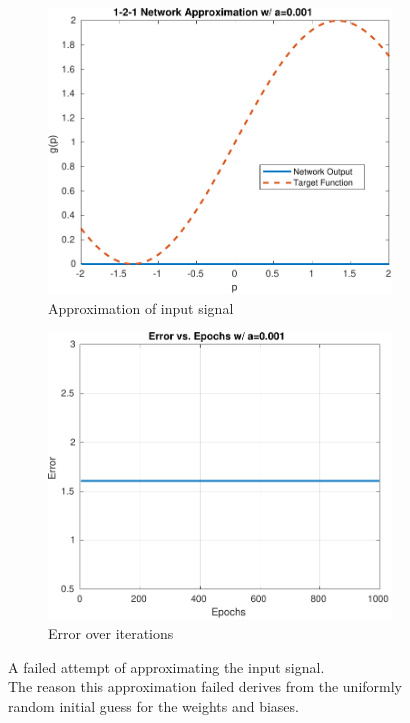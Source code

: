\begin{figure}[htpb]
	\centering
	\begin{subfigure}{0.47\textwidth}
		\centering
		\includegraphics[width=\textwidth]{../Problem 4/1_2_1_failed_approximation.pdf}
		\caption{Approximation of input signal}
	\end{subfigure}
	\begin{subfigure}{0.47\textwidth}
		\centering
		\includegraphics[width=\textwidth]{../Problem 4/1_2_1_failed_approximation_error.pdf}
		\caption{Error over iterations}
	\end{subfigure}
	\caption{A failed attempt of approximating the input signal. \\ The reason this approximation failed derives from the uniformly random initial guess for the weights and biases.}
	\label{fig:prob4_1_2_1_failed_attempt}
\end{figure}

